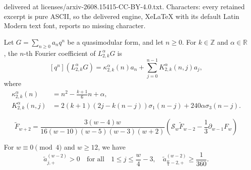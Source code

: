 \documentclass[10pt,a4paper]{amsart}
\newcommand{\bR}{\mathbb{R}}
\newcommand{\bZ}{\mathbb{Z}}
\begin{document}
delivered at licenses/arxiv-2608.15415-CC-BY-4.0.txt. Characters: every retained excerpt is pure ASCII, so the delivered engine, XeLaTeX with its default Latin Modern text font, reports no missing character.
\begin{lemma}
    \label{lem:KZ2_coeff}
    Let $G = \sum_{n \ge 0} a_n q^n$ be a quasimodular form, and let $n \ge 0$.
    For $k \in \bZ$ and $\alpha \in \bR$, the $n$-th Fourier coefficient of $L_{2,k}^{\alpha} G$ is
    \begin{equation}
        \label{eqn:KZ2_coeff}
        [q^n] (L_{2,k}^{\alpha} G) = \kappa_{2,k}^{\alpha}(n) a_n + \sum_{j=0}^{n-1} K_{2,k}^{\alpha}(n,j) a_j,
    \end{equation}
    where
    \begin{align}
        \kappa_{2,k}^{\alpha}(n) &= n^2 - \frac{k+1}{6}n + \alpha, \label{eqn:kappa2} \\
        K_{2,k}^{\alpha}(n,j) &= 2(k+1)(2j-k(n-j)) \sigma_1(n-j) + 240 \alpha \sigma_3(n-j). \label{eqn:K2}
    \end{align}
\end{lemma}

    \begin{equation}
        \label{eqn:Ftilde_rec}
        \widetilde{F}_{w+2} = \frac{3(w-4)w}{16(w-10)(w-5)(w-3)(w+2)} \left(\mathcal{S}_w \widetilde{F}_{w-2} - \frac{1}{3} \partial_{w-1} F_{w}\right)
    \end{equation}

\begin{proposition}
    \label{prop:Ftilde_pos}
    For $w \equiv 0 \pmod{4}$ and $w \ge 12$, we have 
    \begin{equation}
        \tilde{a}_{j,+}^{(w-2)} > 0 \quad \text{for all} \quad 1 \le j \le \frac{w}{4} - 3, \quad \tilde{a}_{\frac{w}{4}-2,+}^{(w-2)} \ge \frac{1}{360}.
    \end{equation}
\end{proposition}
\end{document}
